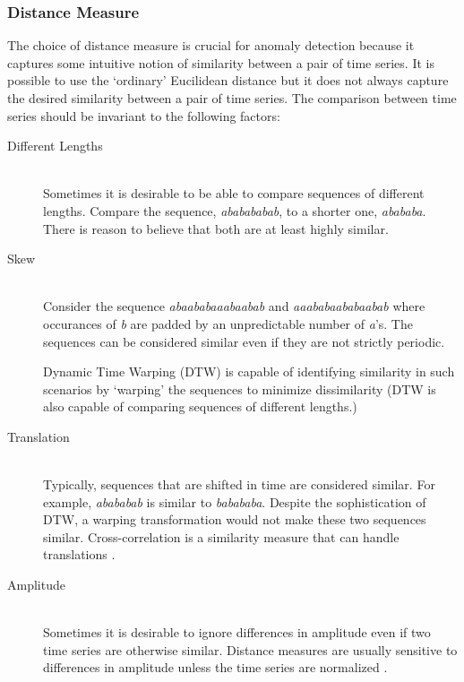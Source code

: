 \subsubsection{Distance Measure}

The choice of distance measure is crucial for anomaly detection because it captures some intuitive notion of similarity between a pair of time series. It is possible to use the `ordinary' Eucilidean distance \cite{Keogh2002} but it does not always capture the desired similarity between a pair of time series. The comparison between time series should be invariant to the following factors:

\begin{description}

\item[Different Lengths] \hfill \\

Sometimes it is desirable to be able to compare sequences of different lengths. Compare the sequence, \emph{ababababab}, to a shorter one, \emph{abababa}. There is reason to believe that both are at least highly similar.

\item[Skew] \hfill \\

Consider the sequence \emph{abaababaaabaabab} and \emph{aaababaababaabab} where occurances of \emph{b} are padded by an unpredictable number of \emph{a}'s. The sequences can be considered similar even if they are not strictly periodic.

Dynamic Time Warping (DTW) \cite{Keogh2002} is capable of identifying similarity in such scenarios by `warping' the sequences to minimize dissimilarity (DTW is also capable of comparing sequences of different lengths.)

\item[Translation] \hfill \\

Typically, sequences that are shifted in time are considered similar. For example, \emph{abababab} is similar to \emph{babababa}. Despite the sophistication of DTW, a warping transformation would not make these two sequences similar.  Cross-correlation is a similarity measure that can handle translations \cite{Protopapas2005}.

\item[Amplitude] \hfill \\

Sometimes it is desirable to ignore differences in amplitude even if two time series are otherwise similar. Distance measures are usually sensitive to differences in amplitude unless the time series are normalized \cite{Keogh2002}. %

\end{description}

